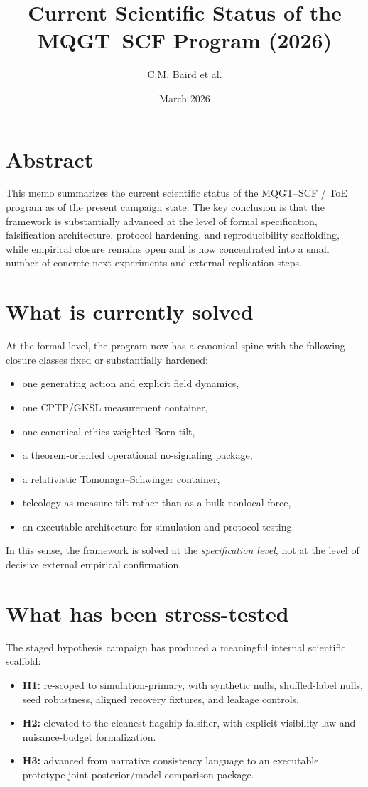 \documentclass[11pt]{article}
\title{Current Scientific Status of the MQGT--SCF Program (2026)}
\author{C.M. Baird et al.}
\date{March 2026}
\begin{document}
\maketitle

\section*{Abstract}
This memo summarizes the current scientific status of the MQGT--SCF / ToE program as of the present campaign state. The key conclusion is that the framework is substantially advanced at the level of formal specification, falsification architecture, protocol hardening, and reproducibility scaffolding, while empirical closure remains open and is now concentrated into a small number of concrete next experiments and external replication steps.

\section{What is currently solved}
At the formal level, the program now has a canonical spine with the following closure classes fixed or substantially hardened:
\begin{itemize}
    \item one generating action and explicit field dynamics,
    \item one CPTP/GKSL measurement container,
    \item one canonical ethics-weighted Born tilt,
    \item a theorem-oriented operational no-signaling package,
    \item a relativistic Tomonaga--Schwinger container,
    \item teleology as measure tilt rather than as a bulk nonlocal force,
    \item an executable architecture for simulation and protocol testing.
\end{itemize}
In this sense, the framework is solved at the \emph{specification level}, not at the level of decisive external empirical confirmation.

\section{What has been stress-tested}
The staged hypothesis campaign has produced a meaningful internal scientific scaffold:
\begin{itemize}
    \item \textbf{H1:} re-scoped to simulation-primary, with synthetic nulls, shuffled-label nulls, seed robustness, aligned recovery fixtures, and leakage controls.
    \item \textbf{H2:} elevated to the cleanest flagship falsifier, with explicit visibility law and nuisance-budget formalization.
    \item \textbf{H3:} advanced from narrative consistency language to an executable prototype joint posterior/model-comparison package.
\end{itemize}
\end{document}

